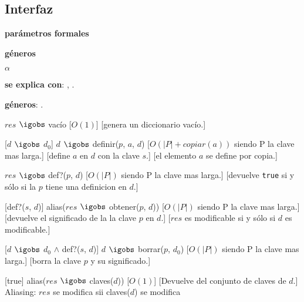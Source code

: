 
\begin{Interfaz}
\subsection{Interfaz}

  \textbf{par\'ametros formales}\parindent\\
  \parbox{1.7cm}{\textbf{g\'eneros}} $\alpha$


  \textbf{se explica con}: , .

  \textbf{g\'eneros}: .

  {$res$ $\igobs$ vac\'io}
  [$O(1)$]
  [genera un diccionario vac\'io.]

  [$d$ $\igobs$ $d_0$]
  {$d$ $\igobs$ definir($p$, $a$, $d$)}
  [$O(|P| + copiar(a))$ siendo P la clave mas larga.]
  [define $a$ en $d$ con la clave $s$.]
  [el elemento $a$ se define por copia.]

  {$res$ $\igobs$ def?($p$, $d$)}
  [$O(|P|)$ siendo P la clave mas larga.]
  [devuelve \texttt{true} si y s\'olo si la $p$ tiene una definicion en $d$.]

  [def?($s$, $d$)]
  {alias($res$ $\igobs$ obtener($p$, $d$))}
  [$O(|P|)$ siendo P la clave mas larga.]
  [devuelve el significado de la la clave $p$ en $d$.]
  [$res$ es modificable si y s\'olo si $d$ es modificable.]

  [$d$ $\igobs$ $d_0$ $\land$ def?($s$, $d$)]
  {$d$ $\igobs$ borrar($p$, $d_0$)}
  [$O(|P|)$ siendo P la clave mas larga.]
  [borra la clave $p$ y su significado.]

  [true]
  {alias($res$ $\igobs$ claves($d$))}
  [$O(1)$]
  [Devuelve del conjunto de claves de $d$.]
  {Aliasing: $res$ se modifica sii claves($d$) se modifica}



\end{Interfaz}

\pagebreak

